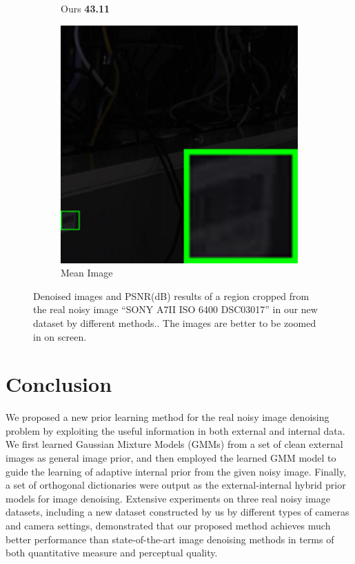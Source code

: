 \begin{figure}
\begin{subfigure}[t]{0.19\textwidth}
\caption{Ours \textbf{43.11}}
    \end{subfigure}
    \hfill
    \begin{subfigure}[t]{0.19\textwidth}
        \centering
        \includegraphics[width=1\textwidth]{images/guided/our/resize_br_Mean_SONY_A7II_ISO6400_DSC03017_part5.png}
\caption{Mean Image}
    \end{subfigure}
    \caption{Denoised images and PSNR(dB) results of a region cropped from the real noisy image ``SONY A7II ISO 6400 DSC03017'' in our new dataset by different methods.. The images are better to be zoomed in on screen.}
    \label{fig3-20}
\end{figure}


\section{Conclusion}

We proposed a new prior learning method for the real noisy image denoising problem by exploiting the useful information in both external and internal data. We first learned Gaussian Mixture Models (GMMs) from a set of clean external images as general image prior, and then employed the learned GMM model to guide the learning of adaptive internal prior from the given noisy image. Finally, a set of orthogonal dictionaries were output as the external-internal hybrid prior models for image denoising. Extensive experiments on three real noisy image datasets, including a new dataset constructed by us by different types of cameras and camera settings, demonstrated that our proposed method achieves much better performance than state-of-the-art image denoising methods in terms of both quantitative measure and perceptual quality.



